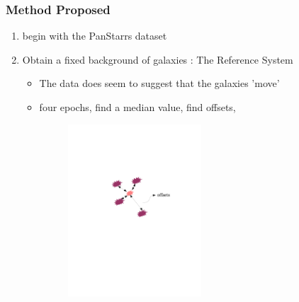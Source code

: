 \documentclass[10pt, compress]{beamer}
\begin{document}
               
\begin{frame}
\frametitle{Method Proposed}
	\begin{enumerate}
		\item begin with  the PanStarrs dataset
        \item Obtain a fixed background of galaxies : The Reference System
        	\begin{itemize}
				\item The data does seem to suggest that the galaxies 'move'
				\item four epochs, find a median value, find offsets, \begin{figure}\includegraphics[width=0.5\textwidth]{3.jpg}\end{figure}
             \end{itemize}   
	\end{enumerate}
\end{frame}   


\end{document}
